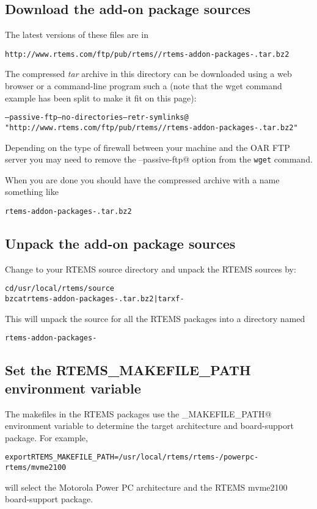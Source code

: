 \documentclass{report}
\begin{document}
\subsection{Download the add-on package sources}
The latest versions of these files are in
\begin{alltt}
http://www.rtems.com/ftp/pub/rtems/\rtemsVersion/rtems-addon-packages-\rtemsVersion.tar.bz2
\end{alltt}

The compressed {\it tar} archive in this directory can be downloaded using a web browser or a command-line program such a \verb@wget@ (note that the
wget command example has been split to make it fit on this page):
{\small
\begin{alltt}
\verb@wget --passive-ftp --no-directories --retr-symlinks@
\hspace{0.3in}"http://www.rtems.com/ftp/pub/rtems/\rtemsVersion/rtems-addon-packages-\rtemsVersion.tar.bz2"
\end{alltt}
}
Depending on the type of firewall between your machine and the OAR FTP server
you may need to remove the \verb@--passive-ftp@ option from the {\tt wget} command.


When you are done you should have the compressed archive with a name something like
\begin{alltt}
rtems-addon-packages-\rtemsVersion.tar.bz2
\end{alltt}

\subsection{Unpack the add-on package sources}
Change to your RTEMS source directory and unpack the RTEMS sources by:
\begin{alltt}
cd /usr/local/rtems/source
bzcat rtems-addon-packages-\rtemsVersion.tar.bz2 | tar xf -
\end{alltt}
This will unpack the source for all the RTEMS packages into a directory named
\begin{alltt}
rtems-addon-packages-\rtemsVersion
\end{alltt}


\subsection{Set the RTEMS\_MAKEFILE\_PATH environment variable}
The makefiles in the RTEMS packages use the \verb@RTEMS_MAKEFILE_PATH@ environment variable to determine the
target architecture and board-support package.  For example,
\begin{alltt}
export RTEMS_MAKEFILE_PATH=/usr/local/rtems/rtems-\rtemsVersion/powerpc-rtems\rtemsVersion/mvme2100
\end{alltt}
will select the Motorola Power PC architecture and the RTEMS mvme2100 board-support package.
\end{document}
